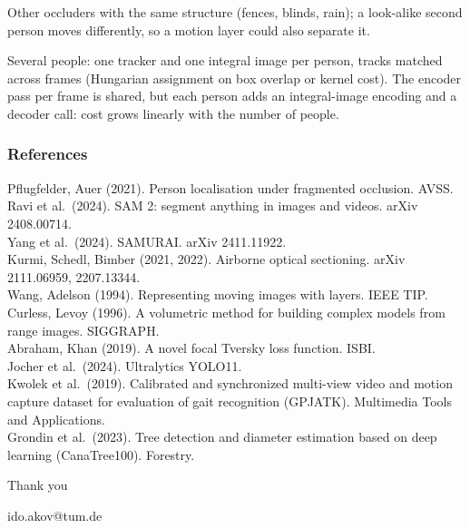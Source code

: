 \begin{frame}
{\item Other occluders with the same structure (fences, blinds, rain); a look-alike second person moves differently, so a motion layer could also separate it.
\item Several people: one tracker and one integral image per person, tracks matched across frames (Hungarian assignment on box overlap or kernel cost). The encoder pass per frame is shared, but each person adds an integral-image encoding and a decoder call: cost grows linearly with the number of people.
}
\end{frame}

\begin{frame}
\frametitle{References}
{\fontsize{9}{11.5}\selectfont
Pflugfelder, Auer (2021). Person localisation under fragmented occlusion. AVSS.\\
Ravi et al.\ (2024). SAM 2: segment anything in images and videos. arXiv 2408.00714.\\
Yang et al.\ (2024). SAMURAI. arXiv 2411.11922.\\
Kurmi, Schedl, Bimber (2021, 2022). Airborne optical sectioning. arXiv 2111.06959, 2207.13344.\\
Wang, Adelson (1994). Representing moving images with layers. IEEE TIP.\\
Curless, Levoy (1996). A volumetric method for building complex models from range images. SIGGRAPH.\\
Abraham, Khan (2019). A novel focal Tversky loss function. ISBI.\\
Jocher et al.\ (2024). Ultralytics YOLO11.\\
Kwolek et al.\ (2019). Calibrated and synchronized multi-view video and motion capture dataset for evaluation of gait recognition (GPJATK). Multimedia Tools and Applications.\\
Grondin et al.\ (2023). Tree detection and diameter estimation based on deep learning (CanaTree100). Forestry.\par}
\end{frame}

\begin{frame}[plain]
\centering
\vspace*{3.2cm}
{\PraesentationSchriftgroesseSehrGross\selectfont Thank you}

\bigskip
ido.akov@tum.de
\end{frame}

